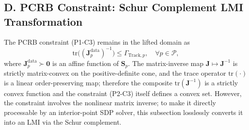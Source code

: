 \documentclass[12pt,a4paper]{article}
\newcommand{\mat}[1]{\mathbf{#1}}
\newcommand{\tr}{\text{tr}}
\begin{document}
\subsection*{D. PCRB Constraint: Schur Complement LMI Transformation}

The PCRB constraint (P1-C3) remains in the lifted domain as
\begin{equation}
\tr\big((\mat{J}_p^{\text{data}})^{-1}\big) \leq \Gamma_{\text{Track},p}, \quad \forall p \in \mathcal{P}, \tag{P2-C3}
\end{equation}
where $\mat{J}_p^{\text{data}} \succ \mat{0}$ is an affine function of $\mat{S}_p$. The matrix-inverse map $\mat{J} \mapsto \mat{J}^{-1}$ is strictly matrix-convex on the positive-definite cone, and the trace operator $\tr(\cdot)$ is a linear order-preserving map; therefore the composite $\tr(\mat{J}^{-1})$ is a strictly convex function and the constraint (P2-C3) itself defines a convex set. However, the constraint involves the nonlinear matrix inverse; to make it directly processable by an interior-point SDP solver, this subsection losslessly converts it into an LMI via the Schur complement.
\end{document}
